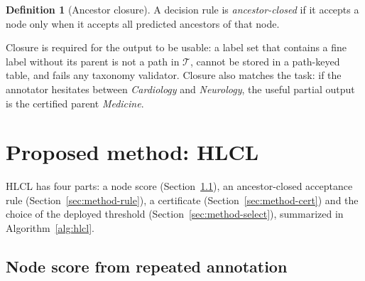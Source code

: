 \documentclass[preprint,12pt]{elsarticle}
\theoremstyle{definition}
\newtheorem{definition}{Definition}
\newcommand{\hlcl}{\textup{\textsc{HLCL}}}
\begin{document}
\begin{definition}[Ancestor closure]
\label{def:closure}
A decision rule is \emph{ancestor-closed} if it accepts a node only when it
accepts all predicted ancestors of that node.
\end{definition}

Closure is required for the output to be usable: a label set that contains a
fine label without its parent is not a path in $\mathcal{T}$, cannot be stored
in a path-keyed table, and fails any taxonomy validator. Closure also matches
the task: if the annotator hesitates between \emph{Cardiology} and
\emph{Neurology}, the useful partial output is the certified parent
\emph{Medicine}.

\section{Proposed method: \hlcl{}}
\label{sec:method}

\hlcl{} has four parts: a node score (Section~\ref{sec:method-score}), an
ancestor-closed acceptance rule (Section~\ref{sec:method-rule}), a certificate
(Section~\ref{sec:method-cert}) and the choice of the deployed threshold
(Section~\ref{sec:method-select}), summarized in Algorithm~\ref{alg:hlcl}.

\subsection{Node score from repeated annotation}
\label{sec:method-score}
\end{document}
